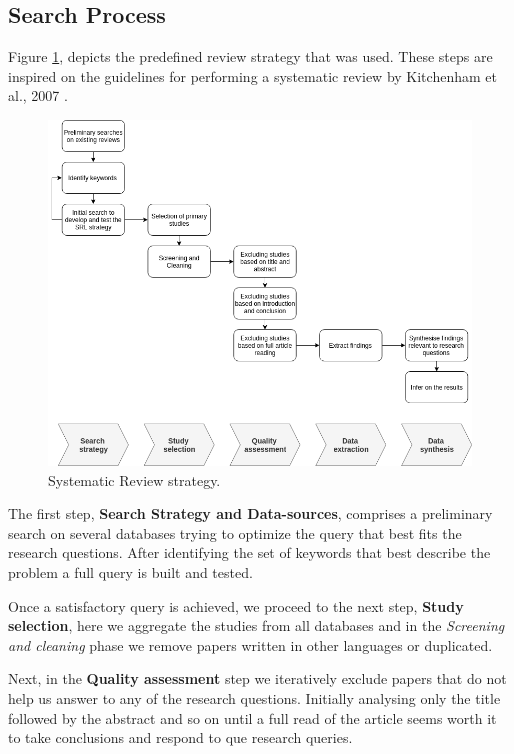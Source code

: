 \documentclass[final,3p,12pt,twocolumn]{elsarticle}
\begin{document}
\subsection{Search Process}\label{search-process}
Figure \ref{fig:/figures/SLR_stages}, depicts the predefined review strategy that was used. These steps are inspired on the guidelines for performing a systematic review by Kitchenham et al., 2007 \cite{Kitchenham2007}.

\begin{figure}[h]
  \begin{center}
    \leavevmode
    \includegraphics[width=\textwidth]{figures/SLR_stages.png}
    \caption{Systematic Review strategy.}
    \label{fig:/figures/SLR_stages}
  \end{center}
\end{figure}

The first step, \textbf{Search Strategy and Data-sources}, comprises a preliminary search on several databases trying to optimize the query that best fits the research questions. After identifying the set of keywords that best describe the problem a full query is built and tested.

Once a satisfactory query is achieved, we proceed to the next step, \textbf{Study selection}, here we aggregate the studies from all databases and in the \textit{Screening and cleaning} phase we remove papers written in other languages or duplicated.

Next, in the \textbf{Quality assessment} step we iteratively exclude papers that do not help us answer to any of the research questions. Initially analysing only the title followed by the abstract and so on until a full read of the article seems worth it to take conclusions and respond to que research queries.
\end{document}
